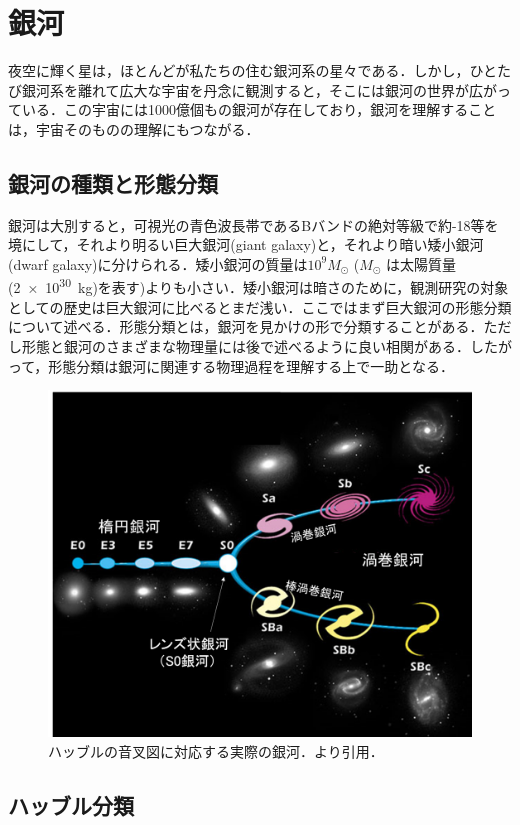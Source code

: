 \section{銀河}

夜空に輝く星は，ほとんどが私たちの住む銀河系の星々である．しかし，ひとたび銀河系を離れて広大な宇宙を丹念に観測すると，そこには銀河の世界が広がっている．この宇宙には1000億個もの銀河が存在しており，銀河を理解することは，宇宙そのものの理解にもつながる．

\subsection{銀河の種類と形態分類}

銀河は大別すると，可視光の青色波長帯であるBバンドの絶対等級で約-18等を境にして，それより明るい巨大銀河(giant galaxy)と，それより暗い矮小銀河(dwarf galaxy)に分けられる．矮小銀河の質量は$10^9 M_\odot$ ($M_\odot$ は太陽質量(\SI{2e+30}{kg})を表す)よりも小さい．矮小銀河は暗さのために，観測研究の対象としての歴史は巨大銀河に比べるとまだ浅い．ここではまず巨大銀河の形態分類について述べる．形態分類とは，銀河を見かけの形で分類することがある．ただし形態と銀河のさまざまな物理量には後で述べるように良い相関がある．したがって，形態分類は銀河に関連する物理過程を理解する上で一助となる．

\begin{figure}[htbp]
	\centering
	\includegraphics[width=0.7\linewidth]{pic/tuning-fork_diagram-2-2-1}
	\captionsetup{width=0.7\linewidth}
	\caption{ハッブルの音叉図に対応する実際の銀河．\citep{the_astronomical_society_of_japan__2017}より引用．}
	\label{fig:tuning-forkdiagram-2-2-1}
\end{figure}

\subsection{ハッブル分類}

